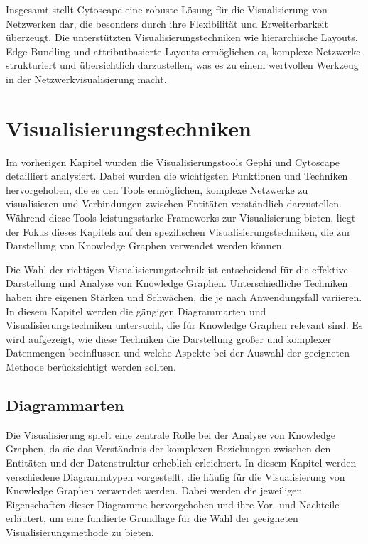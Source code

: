 Insgesamt stellt Cytoscape eine robuste Lösung für die Visualisierung von Netzwerken dar, die besonders durch ihre Flexibilität und Erweiterbarkeit überzeugt. Die unterstützten Visualisierungstechniken wie hierarchische Layouts, Edge-Bundling und attributbasierte Layouts ermöglichen es, komplexe Netzwerke strukturiert und übersichtlich darzustellen, was es zu einem wertvollen Werkzeug in der Netzwerkvisualisierung macht.

\section{Visualisierungstechniken}
\label{theory:vistechniques}

Im vorherigen Kapitel wurden die Visualisierungstools Gephi und Cytoscape detailliert analysiert. Dabei wurden die wichtigsten Funktionen und Techniken hervorgehoben, die es den Tools ermöglichen, komplexe Netzwerke zu visualisieren und Verbindungen zwischen Entitäten verständlich darzustellen. Während diese Tools leistungsstarke Frameworks zur Visualisierung bieten, liegt der Fokus dieses Kapitels auf den spezifischen Visualisierungstechniken, die zur Darstellung von Knowledge Graphen verwendet werden können.

Die Wahl der richtigen Visualisierungstechnik ist entscheidend für die effektive Darstellung und Analyse von Knowledge Graphen. Unterschiedliche Techniken haben ihre eigenen Stärken und Schwächen, die je nach Anwendungsfall variieren. In diesem Kapitel werden die gängigen Diagrammarten und Visualisierungstechniken untersucht, die für Knowledge Graphen relevant sind. Es wird aufgezeigt, wie diese Techniken die Darstellung großer und komplexer Datenmengen beeinflussen und welche Aspekte bei der Auswahl der geeigneten Methode berücksichtigt werden sollten.

\subsection{Diagrammarten}
\label{theory:vistechniques:types}

Die Visualisierung spielt eine zentrale Rolle bei der Analyse von Knowledge Graphen, da sie das Verständnis der komplexen Beziehungen zwischen den Entitäten und der Datenstruktur erheblich erleichtert. In diesem Kapitel werden verschiedene Diagrammtypen vorgestellt, die häufig für die Visualisierung von Knowledge Graphen verwendet werden. Dabei werden die jeweiligen Eigenschaften dieser Diagramme hervorgehoben und ihre Vor- und Nachteile erläutert, um eine fundierte Grundlage für die Wahl der geeigneten Visualisierungsmethode zu bieten.


